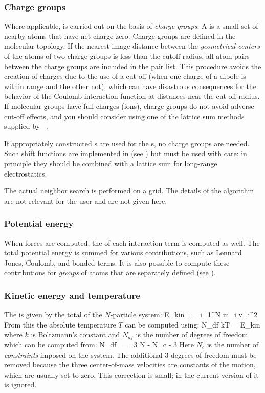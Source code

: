 \subsubsection{Charge groups}
Where applicable,  is carried out on the basis of
{\em  charge groups}. A  is a small set of nearby atoms
that  have net charge zero. Charge groups are defined in the molecular
topology. If the nearest image  distance between the {\em geometrical
centers} of the atoms of two charge groups is less than the cutoff
radius,  all atom pairs between the charge groups are included in the
pair list. This procedure avoids the creation of charges due to
the use  of a cut-off (when one charge of a dipole is within range and
the  other not), which can have disastrous consequences for the
behavior of  the Coulomb interaction function at distances near the
cut-off  radius. If molecular groups have full charges (ions), charge
groups  do not avoid adverse cut-off effects, and you should consider
using one of the lattice sum methods supplied by {\gromacs}~\cite{Berendsen93a}. 

If appropriately
constructed s are used for the 
s, no
charge groups are needed. Such shift functions are implemented
in {\gromacs} (see ) but must be used with
care: in principle they should be combined with a lattice sum for
long-range electrostatics.

The actual neighbor search is performed on a grid. The details of the
algorithm are not relevant for the user and are not given here.

\subsubsection{Potential energy}
When forces are computed, the  of each interaction
term is computed as well. The total potential energy is summed for
various contributions, such as Lennard Jones, Coulomb, and bonded
terms. It is also possible to compute these contributions for {\em
groups} of atoms that are separately defined (see ).

\subsubsection{Kinetic energy and temperature}
The  is given by the total  of the
$N$-particle system:
\beq
E_{kin} = \half \sum_{i=1}^N m_i v_i^2
\eeq
From this the absolute temperature $T$ can be computed using:
\beq
\half N_{df} kT = E_{kin}
\label{eqn:E-T}
\eeq
where $k$ is Boltzmann's constant and $N_{df}$ is the number of
degrees of freedom which can be computed from:
\beq
N_{df}  ~=~     3 N - N_c - 3
\eeq
Here $N_c$ is the number of {\em constraints} imposed on the system.
The additional 3 degrees of freedom must be removed because the three
center-of-mass velocities are constants of the motion, which are usually
set to zero.  This correction is small; in the current version of
{\gromacs} it is ignored.

